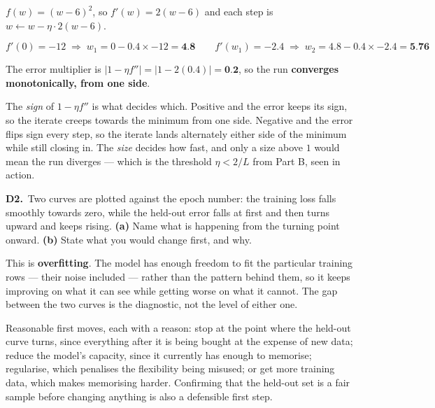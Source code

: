 \documentclass[10pt,a4paper]{article}
\newcommand{\sol}[1]{\textbf{#1}}
\begin{document}
\vspace{2pt}

$f(w) = (w-6)^2$, so $f'(w) = 2(w-6)$ and each step is $w \leftarrow w - \eta \cdot 2(w-6)$.

\[ f'(0) = -12 \;\Rightarrow\; w_1 = 0 - 0.4 \times -12 = \sol{4.8} \qquad f'(w_1) = -2.4 \;\Rightarrow\; w_2 = 4.8 - 0.4 \times -2.4 = \sol{5.76} \]

The error multiplier is $\lvert 1 - \eta f'' \rvert = \lvert 1 - 2(0.4) \rvert = \sol{0.2}$, so the run \sol{converges monotonically, from one side}.

\vspace{2pt}

The \emph{sign} of $1 - \eta f''$ is what decides which. Positive and the error keeps its sign, so the iterate creeps towards the minimum from one side. Negative and the error flips sign every step, so the iterate lands alternately either side of the minimum while still closing in. The \emph{size} decides how fast, and only a size above $1$ would mean the run diverges --- which is the threshold $\eta < 2/L$ from Part B, seen in action.

\vspace{6pt}

\textbf{D2.}\ Two curves are plotted against the epoch number: the training loss falls smoothly towards zero, while the held-out error falls at first and then turns upward and keeps rising. \textbf{(a)} Name what is happening from the turning point onward. \textbf{(b)} State what you would change first, and why.

\vspace{2pt}

This is \textbf{overfitting}. The model has enough freedom to fit the particular training rows --- their noise included --- rather than the pattern behind them, so it keeps improving on what it can see while getting worse on what it cannot. The gap between the two curves is the diagnostic, not the level of either one.\par\vspace{1mm}Reasonable first moves, each with a reason: stop at the point where the held-out curve turns, since everything after it is being bought at the expense of new data; reduce the model's capacity, since it currently has enough to memorise; regularise, which penalises the flexibility being misused; or get more training data, which makes memorising harder. Confirming that the held-out set is a fair sample before changing anything is also a defensible first step.
\end{document}
